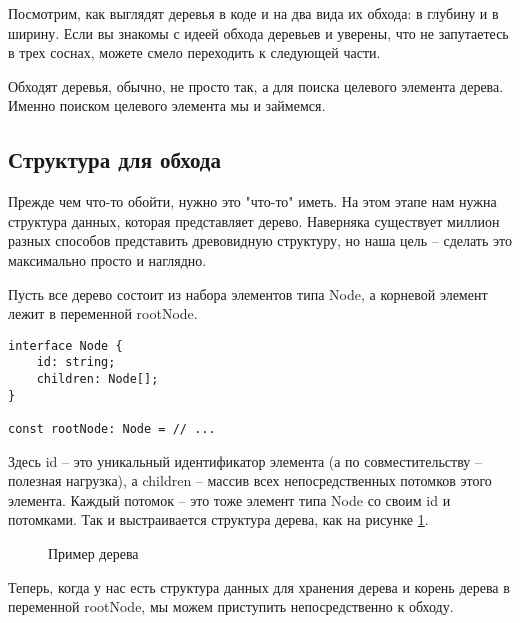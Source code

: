 \documentclass[../../article]{subfiles}
\begin{document}
{Посмотрим, как выглядят деревья в коде и на два вида их обхода: в глубину и в ширину. Если вы знакомы с идеей обхода деревьев и уверены, что не запутаетесь в трех соснах, можете смело переходить к следующей части.}

Обходят деревья, обычно, не просто так, а для поиска целевого элемента дерева. Именно поиском целевого элемента мы и займемся.

\subsection{Структура для обхода}

Прежде чем что-то обойти, нужно это "что-то" иметь. На этом этапе нам нужна структура данных, которая представляет дерево. Наверняка существует миллион разных способов представить древовидную структуру, но наша цель – сделать это максимально просто и наглядно.

Пусть все дерево состоит из набора элементов типа {\firacodebold Node}, а корневой элемент лежит в переменной {\firacodebold rootNode}.
    \begin{ruledelement}
        \begin{lstlisting}[caption={Структура элемента дерева}, label={lst:treeStructure}]
interface Node {
    id: string;
    children: Node[];
}

const rootNode: Node = // ...
        \end{lstlisting}
    \end{ruledelement}

Здесь {\firacodebold id} – это уникальный идентификатор элемента (а по совместительству – полезная нагрузка), а {\firacodebold children} – массив всех непосредственных потомков этого элемента. Каждый потомок – это тоже элемент типа {\firacodebold Node} со своим {\firacodebold id} и потомками. Так и выстраивается структура дерева, как на рисунке \ref{fig:exampleTree}.

\begin{figure}
    \caption{Пример дерева}
    \label{fig:exampleTree}
\end{figure}

Теперь, когда у нас есть структура данных для хранения дерева и корень дерева в переменной {\firacodebold rootNode}, мы можем приступить непосредственно к обходу.
\end{document}
